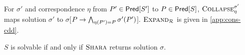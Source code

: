 For $\sigma'$ and %
correspondence $\eta$ from $P' \in \mathsf{Pred}[ S' ]$ to $P \in \mathsf{Pred}[ S ]$,
$\textsc{Collapse}_{\eta}^{\sigma'}$ maps solution $\sigma'$ to
$\sigma$[$P \to \bigwedge_{ \eta(P') = P}
\sigma'(P')$].
%
$\textsc{Expand}_{ \mathcal{R} }$ is given in \autoref{app:cons-cdd}.

\begin{thm}
  \label{thm:corr}
  $S$ is solvable if and only if $\textsc{Shara}$ returns solution $\sigma$.
\end{thm}

